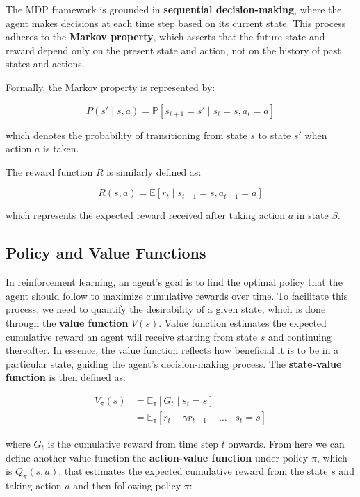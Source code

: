 The MDP framework is grounded in \textbf{sequential decision-making}, where the
agent makes decisions at each time step based on its current state. This
process adheres to the \textbf{Markov property}, which asserts that the future
state and reward depend only on the present state and action, not on the
history of past states and actions.

Formally, the Markov property is represented by:

\begin{equation}
    P(s'\mid s, a) = \mathbb{P}[s_{t+1} = s' \mid s_t = s, a_t = a]
\end{equation}

which denotes the probability of transitioning from state $s$ to state $s'$
when action $a$ is taken.

The reward function \( R \) is similarly defined as:

\begin{equation}
    R(s, a) = \mathbb{E}[r_t \mid s_{t-1} = s, a_{t-1} = a]
\end{equation}

which represents the expected reward received after taking action $a$ in state
$S$.
\subsection{Policy and Value Functions}
In reinforcement learning, an agent's goal is to find the optimal policy that
the agent should follow to maximize cumulative rewards over time. To facilitate
this process, we need to quantify the desirability of a given state, which is
done through the \textbf{value function} $V(s)$. Value function estimates the
expected cumulative reward an agent will receive starting from state \( s \)
and continuing thereafter. In essence, the value function reflects how
beneficial it is to be in a particular state, guiding the agent's
decision-making process. The \textbf{state-value function} is then defined as:

\begin{equation}\label{eq:v_pi}
    \begin{split}
        V_\pi(s) & = \mathbb{E_\pi}[G_t \mid s_t = s]                            \\
                 & = \mathbb{E_\pi}[r_t + \gamma r_{t+1}  + \ldots \mid s_t = s]
    \end{split}
\end{equation}

where \( G_t \) is the cumulative reward from time step $t$ onwards. From here
we can define another value function the \textbf{action-value function} under
policy $\pi$, which is $Q_\pi(s, a)$, that estimates the expected cumulative
reward from the state $s$ and taking action $a$ and then following policy
$\pi$:

